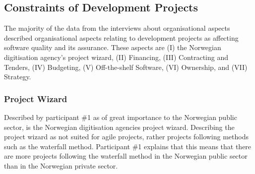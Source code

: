 



\subsection{Constraints of Development Projects} \label{sec:development_projects}
The majority of the data from the interviews about organisational aspects described organisational aspects relating to development projects as affecting software quality and its assurance. These aspects are (I) the Norwegian digitisation agency's project wizard, (II) Financing, (III) Contracting and Tenders, (IV) Budgeting, (V) Off-the-shelf Software, (VI) Ownership, and (VII) Strategy.

\subsubsection{Project Wizard} \label{sec:project_wizard}
Described by participant \#1 as of great importance to the Norwegian public sector, is the Norwegian digitisation agencies project wizard. Describing the project wizard as not suited for agile projects, rather projects following methods such as the waterfall method. Participant \#1 explains that this means that there are more projects following the waterfall method in the Norwegian public sector than in the Norwegian private sector.


